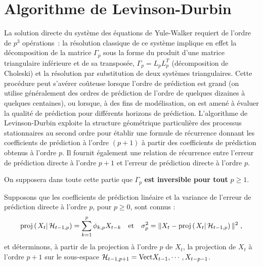 \section{Algorithme de Levinson-Durbin}
\label{sec:algorithme-levinson-durbin}
La solution directe du syst\`eme des \'equations de Yule-Walker
requiert de l'ordre de $p^3$ op\'erations~: la r\'esolution classique
de ce syst\`eme implique en effet la d\'ecomposition de la matrice
$\Gamma_p$ sous la forme du produit d'une matrice triangulaire
inf\'erieure et de sa transpos\'ee, $\Gamma_p = L_p L_p^T$
(d\'ecomposition de Choleski) et la r\'esolution par substitution de
deux syst\`emes triangulaires. Cette proc\'edure peut s'av\'erer
co\^uteuse lorsque l'ordre de pr\'ediction est grand (on utilise
g\'en\'eralement des ordres de pr\'ediction de l'ordre de quelques
dizaines \`a quelques centaines), ou lorsque, \`a des fins de
mod\'elisation, on est amen\'e \`a \'evaluer la qualit\'e de pr\'ediction
pour diff\'erents horizons de pr\'ediction. L'algorithme de
Levinson-Durbin exploite la structure g\'eom\'etrique particuli\`ere
des processus stationnaires au second ordre pour \'etablir une
formule de r\'ecurrence donnant les coefficients de pr\'ediction \`a
l'ordre $(p+1)$ \`a partir des coefficients de pr\'ediction
obtenus \`a l'ordre $p$. Il fournit \'egalement une relation de r\'ecurrence
entre l'erreur de pr\'ediction directe \`a l'ordre $p+1$
et l'erreur de pr\'ediction directe \`a l'ordre $p$.

On supposera dans toute cette partie que {\boldmath$\Gamma_p$} \textbf{est inversible
pour tout} {\boldmath $p\geq 1$}.

Supposons que les
coefficients de pr\'ediction lin\'eaire et la variance de l'erreur de
pr\'ediction directe \`a l'ordre $p$, pour $p \geq 0$, sont connus :
\begin{gather*}
   \proj{X_t}{\cH_{t-1,p}} =
   \sum_{k=1}^{p} \phi_{k,p} X_{t-k}
   \quad\mbox{et}\quad
   \sigma_{p}^2 = \| X_t - \proj{X_t}{\cH_{t-1,p}} \|^2\;,
\end{gather*}
et d\'eterminons, \`a partir de la
projection \`a l'ordre $p$ de $X_t$, la projection de $X_t$ \`a
l'ordre $p+1$ sur le sous-espace $\mathcal{H}_{t-1,p+1} =
\mathrm{Vect}{X_{t-1}, \cdots, X_{t-p-1}}$.

